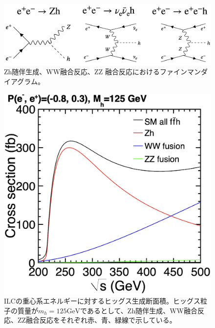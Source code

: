 \begin{figure}[h]
\begin{center}
 \includegraphics[keepaspectratio, scale=0.18]
 	{Figure/Introduction/higgs_cs_feynman.png}
	\caption{Zh随伴生成、WW融合反応、ZZ 融合反応におけるファインマンダイアグラム。}
\end{center}
\end{figure}

\begin{figure}[H]
	\begin{center}
 \includegraphics[keepaspectratio, scale=0.2]
 	{Figure/Introduction/hcs.png}
	 	\caption{ILCの重心系エネルギーに対するヒッグス生成断面積。ヒッグス粒子の質量が$m_h=125 \mathrm{GeV}$であるとして、Zh随伴生成、WW融合反応、ZZ融合反応をそれぞれ赤、青、緑線で示している。}
 	\label{hcs}
	\end{center}
 \end{figure}
 
